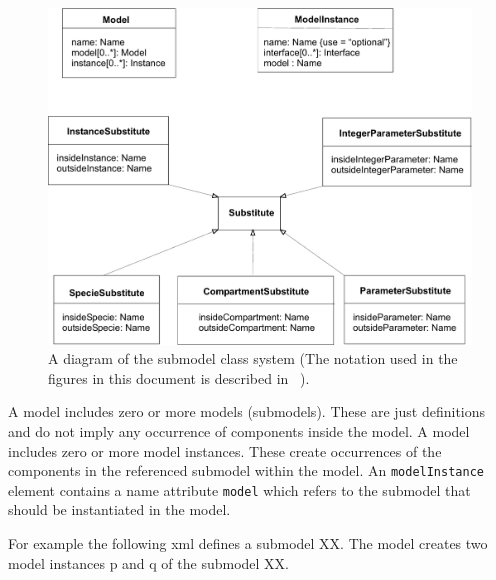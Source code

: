 \documentclass[10pt]{article}
\newcommand{\class}[1]{\texttt{#1}}
\newcommand{\attrib}[1]{\texttt{#1}}
\begin{document}
\begin{figure}

  \centering

  \includegraphics[scale = 0.75]{submodels}

  \caption{A diagram of the submodel class system
    (The notation used in the figures in this document is described in ~\cite{Hucka:Notation}).}

  \label{fig:submodels}

\end{figure}

A model includes zero or more models (submodels).  These are just
definitions and do not imply any occurrence of components inside
the model. A model includes zero or more model instances.  These create
occurrences of the components in the referenced submodel within
the model.  An \class{modelInstance} element contains a name attribute
\attrib{model} which refers to the submodel that should be
instantiated in the model.

For example the following xml defines a submodel XX.
The model creates two model instances p and q of the submodel XX.
\end{document}
